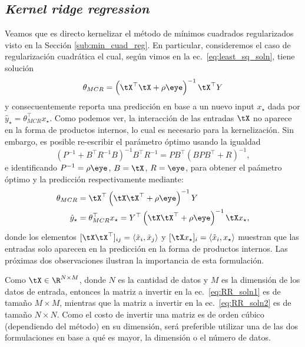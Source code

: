 \subsection{\emph{Kernel ridge regression}}

Veamos que es directo kernelizar el método de mínimos cuadrados regularizados visto en la Sección \ref{sub:min_cuad_reg}. En particular, consideremos el caso de regularización cuadrática el cual, según vimos en la ec.~\eqref{eq:least_sq_soln}, tiene solución
\begin{equation}
    \theta_{MCR} = \left(\tX^\top\tX +\rho \eye\right)^{-1} \tX^\top Y  \label{eq:RR_soln1} 
\end{equation}
 y consecuentemente reporta una predicción en base a un nuevo input $x_\star$ dada por $\hat{y}_\star = \theta_{MCR}^\top x_\star$. Como podemos ver, la interacción de las entradas $\tX$ no aparece en la forma de productos internos, lo cual es necesario para la kernelización. Sin embargo, es posible re-escribir el parámetro óptimo usando la igualdad 
\begin{equation}
    (P^{-1} + B^\top R^{-1} B)^{-1}B^\top R^{-1}= P B^\top (BP B^\top + R)^{-1},\label{eq:matrix_inversion_lemma}
\end{equation}
e identificando $P^{-1}=\rho\eye$, $B=\tX$, $R=\eye$, para obtener el paámetro óptimo y la predicción respectivamente mediante:  
\begin{align}
   \theta_{MCR}     &= \tX^\top\left(\tX\tX^\top + \rho\eye\right) ^{-1} Y\label{eq:RR_soln2} \\
   \hat{y}_\star    &= \theta_{MCR}^\top x_\star = Y^\top \left(\tX\tX^\top + \rho\eye\right) ^{-1} \tX x_\star, \label{eq:RR_pred} 
\end{align}
donde los elementos $[\tX\tX^\top]_{ij} =\langle \tilde{x}_i,\tilde{x}_j \rangle$ y $[\tX x_\star]_i = \langle \tilde{x}_i,x_\star\rangle$  muestran que las entradas solo aparecen en la predicción en la forma de productos internos. Las próximas dos observaciones ilustran la importancia de esta formulación. 
\begin{remark}
Como $\tX\in\R^{N\times M}$, donde $N$ es la cantidad de datos y $M$ es la dimensión de los datos de entrada, entonces la matriz a invertir en la ec.~\eqref{eq:RR_soln1} es de tamaño $M\times M$, mientras que la matriz a invertir en la ec.~\eqref{eq:RR_soln2} es de tamaño $N\times N$. Como el costo de invertir una matriz es de orden cúbico (dependiendo del método) en su dimensión, será preferible utilizar una de las dos formulaciones en base a qué es mayor, la dimensión o el número de datos. 
\end{remark}

